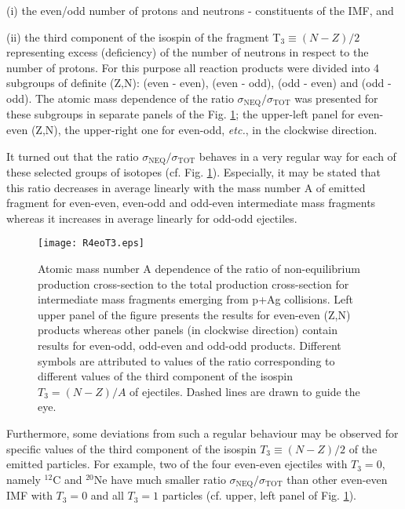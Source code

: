 (i) the even/odd number of protons and neutrons - constituents of
the IMF, and

(ii) the third component of the isospin of the fragment T$_3 \equiv
(N-Z)/2$ representing excess (deficiency) of the number of neutrons
in respect to the number of protons. For this purpose all reaction
products were divided into 4 subgroups of definite (Z,N): (even -
even), (even - odd), (odd - even) and (odd - odd). The atomic mass
dependence of the ratio $\sigma_{\text{NEQ}}/\sigma_{\text{TOT}}$
was presented for these subgroups in separate panels of the Fig.
\ref{fig:R4eoT3}; the upper-left panel for even-even (Z,N), the
upper-right one for even-odd, \emph{etc.}, in the clockwise
direction.

It turned out that the ratio
$\sigma_{\text{NEQ}}/\sigma_{\text{TOT}}$ behaves in a very regular
way for each of these selected groups of isotopes (cf. Fig.
\ref{fig:R4eoT3}). Especially, it may be stated that this ratio
decreases in average linearly with the mass number A of emitted
fragment for even-even, even-odd and odd-even intermediate mass
fragments whereas it increases in average linearly for odd-odd
ejectiles.
%
\begin{figure}[!h]
	\centering
	
		\texttt{[image: R4eoT3.eps]}
	\caption{Atomic mass number A dependence of the ratio of non-equilibrium production
		cross-section to the total production cross-section for intermediate mass fragments
		emerging from p+Ag collisions.  %
		Left upper panel of the figure presents the results for even-even (Z,N) products
		whereas other panels
		(in clockwise direction) contain results for even-odd, odd-even and odd-odd products.
		Different symbols are attributed to values of the ratio corresponding to different values of the third
		component of the isospin $T_3=(N-Z)/A$ of ejectiles. Dashed lines are drawn to guide the eye.}
	\label{fig:R4eoT3}
\end{figure}
%
Furthermore, some deviations from such a regular behaviour may be
observed for specific values of the third component of the isospin
$T_3 \equiv (N-Z)/2$ of the emitted particles. For example, two of
the four even-even ejectiles with $T_3=0$, namely $^{12}$C and
$^{20}$Ne have much smaller ratio
$\sigma_{\text{NEQ}}/\sigma_{\text{TOT}}$ than other even-even IMF
with $T_3=0$ and all $T_3=1$ particles 
(cf. upper, left panel of Fig. \ref{fig:R4eoT3}).

